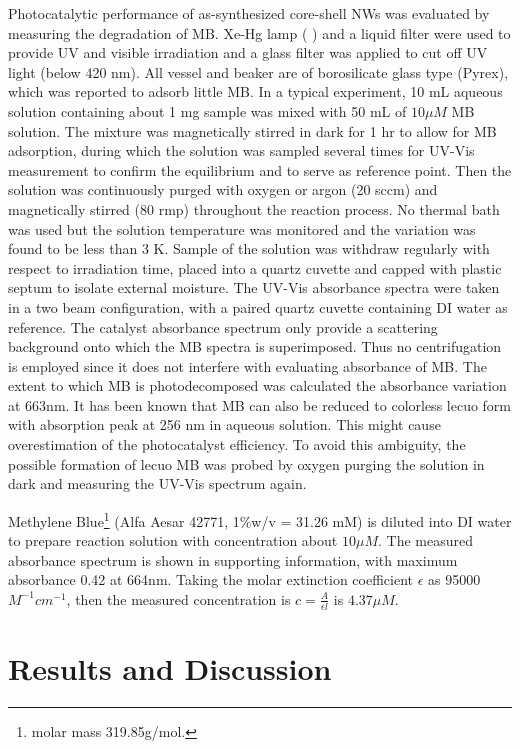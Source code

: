 \documentclass[11pt]{article} %
\begin{document}
Photocatalytic performance of as-synthesized core-shell NWs was evaluated by measuring the degradation of MB. Xe-Hg lamp ( ) and a liquid filter were used to provide UV and visible irradiation and a glass filter was applied to cut off UV light (below 420 nm). All vessel and beaker are of borosilicate glass type (Pyrex), which was reported to adsorb little MB.\cite{Chakrabarti2005} In a typical experiment, 10 mL aqueous solution containing about 1 mg sample was mixed with 50 mL of $10 \mu M$ MB solution. The mixture was magnetically stirred in dark for 1 hr to allow for MB adsorption, during which the solution was sampled several times for UV-Vis measurement to confirm the equilibrium and to serve as reference point. Then the solution was continuously purged with oxygen or argon (20 sccm) and magnetically stirred (80 rmp) throughout the reaction process. No thermal bath was used but the solution temperature was monitored and the variation was found to be less than 3 K. Sample of the solution was withdraw regularly with respect to irradiation time, placed into a quartz cuvette and capped with plastic septum to isolate external moisture. The UV-Vis absorbance spectra were taken in a two beam configuration, with a paired quartz cuvette containing DI water as reference. The catalyst absorbance spectrum only provide a scattering background onto which the MB spectra is superimposed. Thus no centrifugation is employed since it does not interfere with evaluating absorbance of MB. The extent to which MB is photodecomposed was calculated the absorbance variation at 663nm. It has been known that MB can also be reduced to colorless lecuo form with absorption peak at 256 nm in aqueous solution.\cite{Mills1999} This might cause overestimation of the photocatalyst efficiency. To avoid this ambiguity, the possible formation of lecuo MB was probed by oxygen purging the solution in dark and measuring the UV-Vis spectrum again.

Methylene Blue\footnote{ molar mass 319.85g/mol.} (Alfa Aesar 42771, 1\%w/v = 31.26 mM) is diluted into DI water to prepare reaction solution with concentration about $10 \mu M$. The measured absorbance spectrum is shown in supporting information, with maximum absorbance 0.42 at 664nm. Taking the  molar extinction coefficient $\epsilon$ as 95000 $M^{-1}cm^{-1}$,\cite{Cenens1988} then the measured concentration is $c = \frac{A}{\epsilon l}$ is $4.37 \mu M$.




\section{Results and Discussion}
\end{document}
